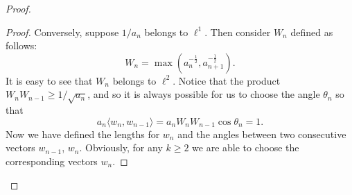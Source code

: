 \begin{proof}
\begin{proof}
      Conversely, suppose $1/a_n$ belongs to $\ell^1$.
      Then consider $W_n$ defined as follows:
      \[
        W_n = \max(a_n^{-\frac{1}{2}}, a^{-\frac{1}{2}}_{n+1}).
      \]
      It is easy to see that $W_n$ belongs to $\ell^2$.
      Notice that the product $W_nW_{n-1} \geq 1/\sqrt{a_n}$, and so it is always possible for us to choose the angle $\theta_n$ so that
      \[
        a_n \langle w_n, w_{n-1} \rangle = a_n W_n W_{n-1}\cos{\theta_n} = 1.
      \]
      Now we have defined the lengths for $w_n$ and the angles between two consecutive vectors $w_{n-1}$, $w_n$.
      Obviously, for any $k \geq 2$ we are able to choose the corresponding vectors $w_n$.
    \end{proof}
  \end{proof}
